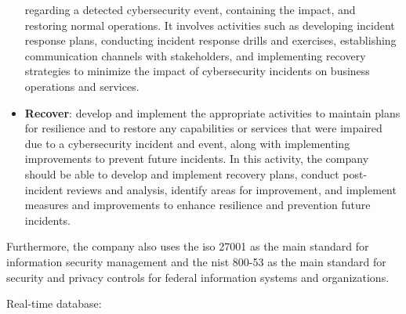 \begin{itemize}
            regarding a detected cybersecurity event, containing the impact, and restoring normal operations.
            It involves activities such as developing incident response plans, conducting incident response
            drills and exercises, establishing communication channels with stakeholders, and implementing
            recovery strategies to minimize the impact of cybersecurity incidents on business operations and
            services.
      \item \textbf{Recover}: develop and implement the appropriate activities to maintain plans for
            resilience and to restore any capabilities or services that were impaired due to a cybersecurity
            incident and event, along with implementing improvements to prevent future incidents. In this
            activity,  the company should be able to develop and implement recovery plans, conduct
            post-incident reviews and analysis, identify areas for improvement, and implement measures and
            improvements to enhance resilience and prevention future incidents.
\end{itemize}


Furthermore, the company also uses the \acrshort{iso} 27001 as the main standard for information security
management and the \acrshort{nist} 800-53 as the main standard for security and privacy controls for federal
information systems and organizations.

\item Real-time database:


